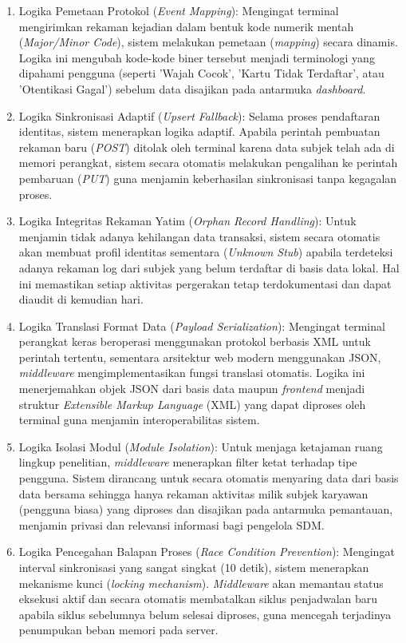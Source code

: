 \begin{enumerate}
    \item Logika Pemetaan Protokol (\textit{Event Mapping}): Mengingat terminal mengirimkan rekaman kejadian dalam bentuk kode numerik mentah (\textit{Major/Minor Code}), sistem melakukan pemetaan (\textit{mapping}) secara dinamis. Logika ini mengubah kode-kode biner tersebut menjadi terminologi yang dipahami pengguna (seperti 'Wajah Cocok', 'Kartu Tidak Terdaftar', atau 'Otentikasi Gagal') sebelum data disajikan pada antarmuka \textit{dashboard}.
    \item Logika Sinkronisasi Adaptif (\textit{Upsert Fallback}): Selama proses pendaftaran identitas, sistem menerapkan logika adaptif. Apabila perintah pembuatan rekaman baru (\textit{POST}) ditolak oleh terminal karena data subjek telah ada di memori perangkat, sistem secara otomatis melakukan pengalihan ke perintah pembaruan (\textit{PUT}) guna menjamin keberhasilan sinkronisasi tanpa kegagalan proses.
    \item Logika Integritas Rekaman Yatim (\textit{Orphan Record Handling}): Untuk menjamin tidak adanya kehilangan data transaksi, sistem secara otomatis akan membuat profil identitas sementara (\textit{Unknown Stub}) apabila terdeteksi adanya rekaman log dari subjek yang belum terdaftar di basis data lokal. Hal ini memastikan setiap aktivitas pergerakan tetap terdokumentasi dan dapat diaudit di kemudian hari.
    \item Logika Translasi Format Data (\textit{Payload Serialization}): Mengingat terminal perangkat keras beroperasi menggunakan protokol berbasis XML untuk perintah tertentu, sementara arsitektur web modern menggunakan JSON, \textit{middleware} mengimplementasikan fungsi translasi otomatis. Logika ini menerjemahkan objek JSON dari basis data maupun \textit{frontend} menjadi struktur \textit{Extensible Markup Language} (XML) yang dapat diproses oleh terminal guna menjamin interoperabilitas sistem.
    \item Logika Isolasi Modul (\textit{Module Isolation}): Untuk menjaga ketajaman ruang lingkup penelitian, \textit{middleware} menerapkan filter ketat terhadap tipe pengguna. Sistem dirancang untuk secara otomatis menyaring data dari basis data bersama sehingga hanya rekaman aktivitas milik subjek karyawan (pengguna biasa) yang diproses dan disajikan pada antarmuka pemantauan, menjamin privasi dan relevansi informasi bagi pengelola SDM.
    \item Logika Pencegahan Balapan Proses (\textit{Race Condition Prevention}): Mengingat interval sinkronisasi yang sangat singkat (10 detik), sistem menerapkan mekanisme kunci (\textit{locking mechanism}). \textit{Middleware} akan memantau status eksekusi aktif dan secara otomatis membatalkan siklus penjadwalan baru apabila siklus sebelumnya belum selesai diproses, guna mencegah terjadinya penumpukan beban memori pada server.

\end{enumerate}
